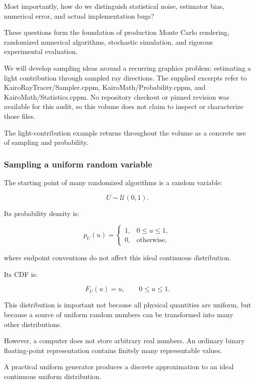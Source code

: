 Most importantly, how do we distinguish statistical noise, estimator bias, numerical error, and actual implementation bugs?

These questions form the foundation of production Monte Carlo rendering, randomized numerical algorithms, stochastic simulation, and rigorous experimental evaluation.

We will develop sampling ideas around a recurring graphics problem: estimating a light contribution through sampled ray directions. The supplied excerpts refer to KairoRayTracer/Sampler.cppm, KairoMath/Probability.cppm, and KairoMath/Statistics.cppm. No repository checkout or pinned revision was available for this audit, so this volume does not claim to inspect or characterize those files.

The light-contribution example returns throughout the volume as a concrete use of sampling and probability.

\subsubsection{Sampling a uniform random variable}\label{02-foundations-ii-ch029-sampling-a-uniform-random-variable}

\hypertarget{02-foundations-ii-ch029-sampling-a-uniform-random-variable}{}

The starting point of many randomized algorithms is a random variable:

\[
 U\sim\mathcal U(0,1).
\]

Its probability density is:

\[
 p_U(u)= \begin{cases} 1,&0\le u\le1,\\ 0,&\text{otherwise}, \end{cases}
\]

where endpoint conventions do not affect this ideal continuous distribution.

Its CDF is:

\[
 F_U(u)=u,\qquad 0\le u\le1.
\]

This distribution is important not because all physical quantities are uniform, but because a source of uniform random numbers can be transformed into many other distributions.

However, a computer does not store arbitrary real numbers. An ordinary binary floating-point representation contains finitely many representable values.

A practical uniform generator produces a discrete approximation to an ideal continuous uniform distribution.

